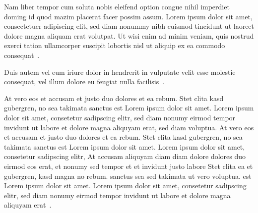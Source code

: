 Nam liber tempor cum soluta nobis eleifend option congue nihil imperdiet doming
id quod mazim placerat facer possim assum. Lorem ipsum dolor sit amet,
consectetuer adipiscing elit, sed diam nonummy nibh euismod tincidunt ut laoreet
dolore magna aliquam erat volutpat. Ut wisi enim ad minim veniam, quis nostrud
exerci tation ullamcorper suscipit lobortis nisl ut aliquip ex ea commodo
consequat~\cite{cham:tgrar}.

Duis autem vel eum iriure dolor in hendrerit in vulputate velit esse molestie
consequat, vel illum dolore eu feugiat nulla facilisis~\cite{chin:mcswa}.

At vero eos et accusam et justo duo dolores et ea rebum. Stet clita kasd
gubergren, no sea takimata sanctus est Lorem ipsum dolor sit amet. Lorem ipsum
dolor sit amet, consetetur sadipscing elitr,  sed diam nonumy eirmod tempor
invidunt ut labore et dolore magna aliquyam erat, sed diam voluptua. At vero
eos et accusam et justo duo dolores et ea rebum. Stet clita kasd gubergren, no
sea takimata sanctus est Lorem ipsum dolor sit amet. Lorem ipsum dolor sit
amet, consetetur sadipscing elitr,  At accusam aliquyam diam diam dolore
dolores duo eirmod eos erat, et nonumy sed tempor et et invidunt justo labore
Stet clita ea et gubergren, kasd magna no rebum. sanctus sea sed takimata ut
vero voluptua. est Lorem ipsum dolor sit amet. Lorem ipsum dolor sit amet,
consetetur sadipscing elitr,  sed diam nonumy eirmod tempor invidunt ut labore
et dolore magna aliquyam erat~\cite{chun:mamra}.

